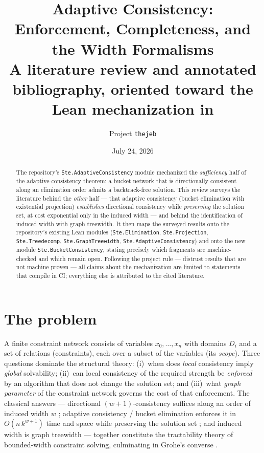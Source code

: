 \documentclass[11pt]{article}
\title{Adaptive Consistency: Enforcement, Completeness, and the Width
Formalisms\\
\large A literature review and annotated bibliography, oriented toward
the Lean mechanization in \ste{Ste.BucketConsistency}}
\author{Project \texttt{thejeb}}
\date{July 24, 2026}
\newcommand{\ste}[1]{\texttt{#1}}
\begin{document}
\maketitle

\begin{abstract}
The repository's \ste{Ste.AdaptiveConsistency} module mechanized the
\emph{sufficiency} half of the adaptive-consistency theorem: a bucket
network that is directionally consistent along an elimination order
admits a backtrack-free solution. This review surveys the literature
behind the \emph{other} half --- that adaptive consistency (bucket
elimination with existential projection) \emph{establishes} directional
consistency while \emph{preserving} the solution set, at cost
exponential only in the induced width --- and behind the identification
of induced width with graph treewidth. It then maps the surveyed
results onto the repository's existing Lean modules
(\ste{Ste.Elimination}, \ste{Ste.Projection}, \ste{Ste.Treedecomp},
\ste{Ste.GraphTreewidth}, \ste{Ste.AdaptiveConsistency}) and onto the
new module \ste{Ste.BucketConsistency}, stating precisely which
fragments are machine-checked and which remain open. Following the
project rule --- distrust results that are not machine proven --- all
claims about the mechanization are limited to statements that compile
in CI; everything else is attributed to the cited literature.
\end{abstract}

\section{The problem}

A finite constraint network consists of variables $x_0,\dots,x_n$ with
domains $D_i$ and a set of relations (constraints), each over a subset
of the variables (its \emph{scope}). Three questions dominate the
structural theory: (i)~when does \emph{local} consistency imply
\emph{global} solvability; (ii)~can local consistency of the required
strength be \emph{enforced} by an algorithm that does not change the
solution set; and (iii)~what \emph{graph parameter} of the constraint
network governs the cost of that enforcement. The classical answers ---
directional $(w{+}1)$-consistency suffices along an order of induced
width $w$ \citep{freuder1982backtrack, dechterpearl1987network};
adaptive consistency / bucket elimination enforces it in
$O(n\,k^{w+1})$ time and space while preserving the solution set
\citep{dechterpearl1987network, dechter1999bucket,
dechter2003constraint}; and induced width is graph treewidth
\citep{arnborg1987complexity, bodlaender1998arboretum} --- together
constitute the tractability theory of bounded-width constraint solving,
culminating in Grohe's converse \citep{grohe2007complexity}.
\end{document}
